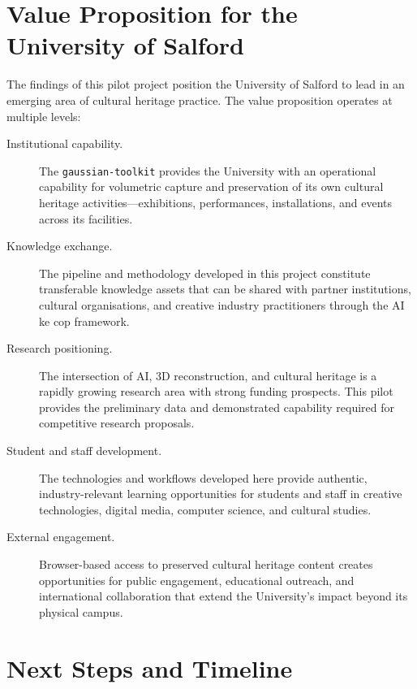 \section{Value Proposition for the University of Salford}
\label{sec:conc-value}

The findings of this pilot project position the University of Salford to lead in an emerging area of cultural heritage practice. The value proposition operates at multiple levels:

\begin{description}
  \item[Institutional capability.] The \texttt{gaussian-toolkit} provides the University with an operational capability for volumetric capture and preservation of its own cultural heritage activities---exhibitions, performances, installations, and events across its facilities.

  \item[Knowledge exchange.] The pipeline and methodology developed in this project constitute transferable knowledge assets that can be shared with partner institutions, cultural organisations, and creative industry practitioners through the AI \acrshort{ke} \acrshort{cop} framework.

  \item[Research positioning.] The intersection of AI, 3D reconstruction, and cultural heritage is a rapidly growing research area with strong funding prospects. This pilot provides the preliminary data and demonstrated capability required for competitive research proposals.

  \item[Student and staff development.] The technologies and workflows developed here provide authentic, industry-relevant learning opportunities for students and staff in creative technologies, digital media, computer science, and cultural studies.

  \item[External engagement.] Browser-based access to preserved cultural heritage content creates opportunities for public engagement, educational outreach, and international collaboration that extend the University's impact beyond its physical campus.
\end{description}

\section{Next Steps and Timeline}
\label{sec:conc-next}

